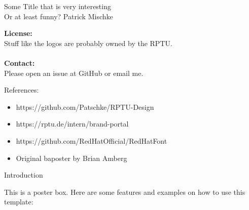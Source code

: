 \documentclass[
  a0paper,
  portrait,
  fontscale=.35 %
  ]{baposterrptu}
\begin{document}
\begin{poster}{
  }
  {}%
  {Some Title that is very interesting\\
    \sf Or at least funny?}
  {Patrick Mischke}
  {\rptuLogo}
  {
    \begin{minipage}{.8\footerheight}
    \end{minipage}
    \hfill
    \begin{minipage}{.35\paperwidth}
      \textbf{License:}\\
      Stuff like the logos are probably owned by the RPTU.\\\\
      \textbf{Contact:}\\
      Please open an issue at GitHub or email me.
    \end{minipage}
  }
  {
    References:
    \begin{itemize}
      \item https://github.com/Patschke/RPTU-Design
      \item https://rptu.de/intern/brand-portal
      \item https://github.com/RedHatOfficial/RedHatFont
      \item Original baposter by Brian Amberg
    \end{itemize}
  }
  \begin{posterbox}[name=intro,column=0,row=0]{Introduction}

    This is a poster box. Here are some features and examples on how to use this template:


\end{posterbox}
\end{poster}
\end{document}
